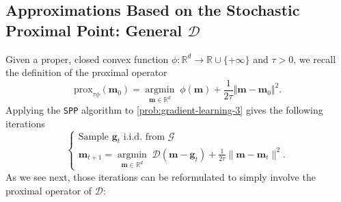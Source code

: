 \documentclass[10pt]{article} %
\renewcommand{\vec}[1]{\bm{#1}}
\newcommand{\bz}{\bm{z}}
\newcommand{\m}{\bm{m}}
\newcommand{\bg}{\bm{g}}
\DeclareMathOperator{\argmininn}{argmin}
\newcommand{\argmin}[1]{ \underset{#1}{\argmininn} \;}
\newcommand{\prox}[1]{\mathrm{prox}_{#1}}
\newcommand{\dist}{\mathcal{D}}
\let\temp\phi
\let\phi\varphi
\let\varphi\temp
\newcommand{\SPP}{\texttt{SPP}}
\begin{document}



\subsection{Approximations Based on the Stochastic Proximal Point: General $\mathcal{D}$}\label{SS:SPP:general D formulas}

Given a proper, closed convex function $\varphi : \mathbb{R}^d \to \mathbb{R}\cup\{+\infty\}$ and $\tau > 0$, we recall the definition of the proximal operator
\begin{equation*}
    \prox{\tau \varphi}(\m_0) = \argmin{\m \in \mathbb{R}^d} \varphi(\m) + \frac{1}{2 \tau} \Vert \m - \m_0 \Vert^2.
\end{equation*}
Applying the \SPP{} algorithm to \eqref{prob:gradient-learning-3} gives the following iterations 
\begin{equation}\label{D:SPP median D abstract}
    \begin{cases}
        \text{Sample $\bg_t$ i.i.d. from $\mathcal{G}$} \\
    \m_{t+1} = \argmin{\m \in \mathbb{R}^d} \dist(\vec{m} - \vec{g}_t) + \frac{1}{2\tau}\|\vec{m}-\vec{m}_t\|^2.
    \end{cases}
\end{equation}
As we see next, those iterations can be reformulated to simply involve the proximal operator of $\mathcal{D}$:
\end{document}
